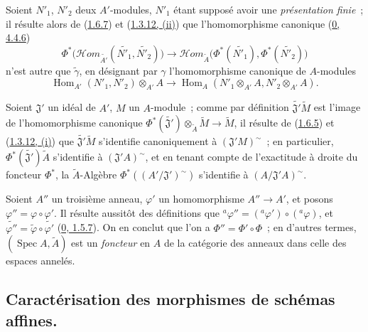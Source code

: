 \begin{env}[1.6.8]
\label{I.1.6.8-fr}
Soient $N'_1$, $N'_2$ deux $A'$-modules, $N'_1$ étant supposé avoir une
\emph{présentation finie}~; il résulte alors de
(\hyperref[I.1.6.7-fr]{1.6.7}) et
(\hyperref[I.1.3.12-fr]{1.3.12, (ii)}) que l'homomorphisme canonique
(\hyperref[0.4.4.6-fr]{0, 4.4.6})
\[
  \Phi^*\bigl(\mathscr{H}\!om_{\widetilde{A'}}
    (\widetilde{N'_1},\widetilde{N'_2})\bigr)
  \longrightarrow
  \mathscr{H}\!om_{\widetilde A}
    \bigl(\Phi^*(\widetilde{N'_1}),\Phi^*(\widetilde{N'_2})\bigr)
\]
n'est autre que $\widetilde{\gamma}$, en désignant par $\gamma$
l'homomorphisme canonique de $A$-modules
\[
  \operatorname{Hom}_{A'}(N'_1,N'_2)\otimes_{A'}A
  \longrightarrow
  \operatorname{Hom}_A(N'_1\otimes_{A'}A,N'_2\otimes_{A'}A).
\]
\end{env}

\begin{env}[1.6.9]
\label{I.1.6.9-fr}
Soient $\mathfrak{J}'$ un idéal de $A'$, $M$ un $A$-module~; comme par
définition $\widetilde{\mathfrak{J}'}\widetilde M$ est l'image de
l'homomorphisme canonique
$\Phi^*(\widetilde{\mathfrak{J}'})\otimes_{\widetilde A}\widetilde M
\to\widetilde M$, il résulte de (\hyperref[I.1.6.5-fr]{1.6.5}) et
(\hyperref[I.1.3.12-fr]{1.3.12, (i)}) que
$\widetilde{\mathfrak{J}'}\widetilde M$ s'identifie canoniquement à
$(\mathfrak{J}'M)^{\sim}$~; en particulier,
$\Phi^*(\widetilde{\mathfrak{J}'})\widetilde A$ s'identifie à
$(\mathfrak{J}'A)^{\sim}$, et en tenant compte de l'exactitude à droite du
foncteur $\Phi^*$, la $\widetilde A$-Algèbre
$\Phi^*((A'/\mathfrak{J}')^{\sim})$ s'identifie à
$(A/\mathfrak{J}'A)^{\sim}$.
\end{env}

\begin{env}[1.6.10]
\label{I.1.6.10-fr}
Soient $A''$ un troisième anneau, $\varphi'$ un homomorphisme
$A''\to A'$, et posons $\varphi''=\varphi\circ\varphi'$. Il résulte
aussitôt des définitions que
${}^a\varphi''=({}^a\varphi')\circ({}^a\varphi)$, et
$\widetilde{\varphi''}=\widetilde\varphi\circ\widetilde{\varphi'}$
(\hyperref[0.1.5.7-fr]{0, 1.5.7}). On en conclut que l'on a
$\Phi''=\Phi'\circ\Phi$~; en d'autres termes,
$(\operatorname{Spec} A,\widetilde A)$ est un \emph{foncteur} en $A$ de la
catégorie des anneaux dans celle des espaces annelés.
\end{env}

\subsection{Caractérisation des morphismes de schémas affines.}
\label{subsection:I.1.7-fr}


